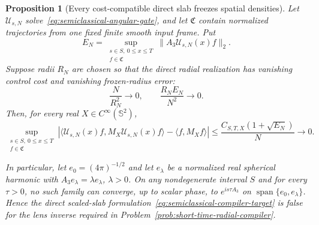 \documentclass[11pt]{article}
\newtheorem{proposition}[theorem]{Proposition}
\theoremstyle{remark}
\begin{document}
\begin{proposition}[Every cost-compatible direct slab freezes spatial
densities]
\label{prop:direct-scaled-slab-density-no-go}
Let $\mathcal U_{s,N}$ solve~\eqref{eq:semiclassical-angular-gate}, and let
$\mathfrak C$ contain normalized trajectories from one fixed finite smooth
input frame.  Put
\begin{equation}
 E_N=
 \sup_{\substack{s\in S,\ 0\leq x\leq T\\f\in\mathfrak C}}
 \|A_3\mathcal U_{s,N}(x)f\|_2.
 \label{eq:direct-slab-trajectory-energy}
\end{equation}
Suppose radii $R_N$ are chosen so that the direct radial realization has
vanishing control cost and vanishing frozen-radius error:
\begin{equation}
 \frac{N}{R_N^2}\longrightarrow0,
 \qquad
 \frac{R_NE_N}{N^2}\longrightarrow0.
 \label{eq:direct-slab-compatibility-no-go}
\end{equation}
Then, for every real $X\in C^\infty(\mathbb S^2)$,
\begin{equation}
 \sup_{\substack{s\in S,\ 0\leq x\leq T\\f\in\mathfrak C}}
 \left|
 \langle\mathcal U_{s,N}(x)f,M_X\mathcal U_{s,N}(x)f\rangle
 -
 \langle f,M_Xf\rangle
 \right|
 \leq
 \frac{C_{S,T,X}(1+\sqrt{E_N})}{N}
 \longrightarrow0.
 \label{eq:direct-slab-density-freezing}
\end{equation}

In particular, let $e_0=(4\pi)^{-1/2}$ and let $e_\lambda$ be a normalized
real spherical harmonic with $A_3e_\lambda=\lambda e_\lambda$,
$\lambda>0$.  On any nondegenerate interval $S$ and for every $\tau>0$,
no such family can converge, up to scalar phase, to
$e^{is\tau A_3}$ on
$\operatorname{span}\{e_0,e_\lambda\}$.  Hence the direct scaled-slab
formulation~\eqref{eq:semiclassical-compiler-target} is false for the lens
inverse required in Problem~\ref{prob:short-time-radial-compiler}.
\end{proposition}
\end{document}

